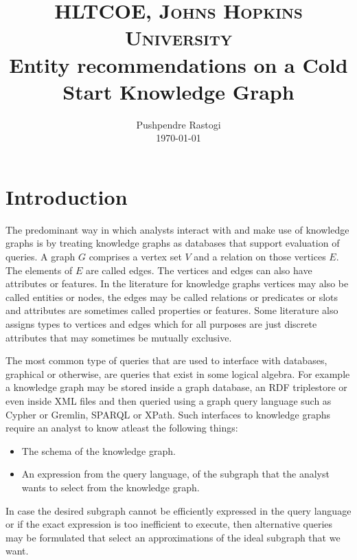 \documentclass[paper=a4,fontsize=11pt]{scrartcl}
\title{
  \vspace{-1in}
  \usefont{OT1}{bch}{b}{n}
  \normalfont\normalsize\textsc{HLTCOE, Johns Hopkins University}\\
  \huge Entity recommendations on a Cold Start Knowledge Graph\\
}
\author{
  \normalfont\normalsize
  Pushpendre Rastogi\\
  [-3pt]\normalsize\today%
}
\date{}
\numberwithin{equation}{section}    %
\numberwithin{figure}{section}      %
\numberwithin{table}{section}       %
\begin{document}
\maketitle
\section{Introduction}
\label{sec:introduction}
The predominant way in which analysts interact with and make use of knowledge
graphs is by treating knowledge graphs as databases that support evaluation
of queries. A graph $G$ comprises a vertex set $V$ and a relation
on those vertices $E$. The elements of $E$ are called edges.
The vertices and edges can also have attributes or features.
In the literature for knowledge
graphs vertices may also be called entities or nodes, the edges may be
called relations or predicates or slots and attributes are sometimes called properties or
features. Some literature also assigns types to
vertices and edges which for all purposes are just discrete attributes that may
sometimes be mutually exclusive.

The most common type of queries that are used to interface with
databases, graphical or otherwise, are queries that exist in some logical
algebra. For example a knowledge graph may be stored inside a graph database,
an RDF {triplestore} or even inside XML files and then queried using a graph
query language such as Cypher or Gremlin, SPARQL or XPath. Such interfaces to
knowledge graphs require an analyst to know atleast the following things:
\begin{itemize}
\item The schema of the knowledge graph.
\item An expression from the query language, of the subgraph that the
  analyst wants to select from the knowledge graph.
\end{itemize}
In case the desired subgraph cannot be efficiently expressed in the query
language or if the exact expression is too inefficient to execute, then
alternative queries may be formulated that select an approximations of
the ideal subgraph that we want.
\end{document}
